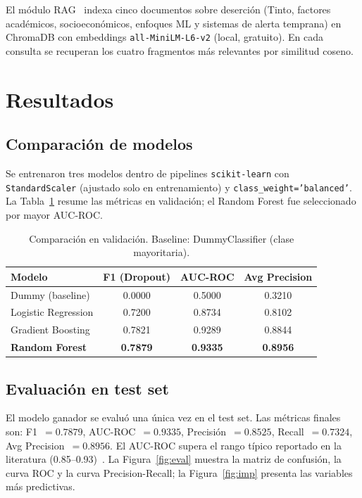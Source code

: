 \documentclass[11pt, a4paper]{article}
\begin{document}
El módulo RAG~\cite{chromadb2023} indexa cinco documentos sobre deserción
(Tinto, factores académicos, socioeconómicos, enfoques ML y sistemas de
alerta temprana) en ChromaDB con embeddings \texttt{all-MiniLM-L6-v2}
(local, gratuito). En cada consulta se recuperan los cuatro fragmentos
más relevantes por similitud coseno.

\section{Resultados}

\subsection{Comparación de modelos}

Se entrenaron tres modelos dentro de pipelines \texttt{scikit-learn} con
\texttt{StandardScaler} (ajustado solo en entrenamiento) y
\texttt{class\_weight='balanced'}. La Tabla~\ref{tab:modelos} resume las
métricas en validación; el Random Forest fue seleccionado por mayor AUC-ROC.

\begin{table}[H]
  \centering\small
  \caption{Comparación en validación. Baseline: DummyClassifier (clase mayoritaria).}
  \label{tab:modelos}
  \begin{tabular}{lccc}
    \toprule
    \textbf{Modelo} & \textbf{F1 (Dropout)} & \textbf{AUC-ROC} & \textbf{Avg Precision} \\
    \midrule
    Dummy (baseline)    & 0.0000 & 0.5000 & 0.3210 \\
    Logistic Regression & 0.7200 & 0.8734 & 0.8102 \\
    Gradient Boosting   & 0.7821 & 0.9289 & 0.8844 \\
    \textbf{Random Forest} & \textbf{0.7879} & \textbf{0.9335} & \textbf{0.8956} \\
    \bottomrule
  \end{tabular}
\end{table}

\subsection{Evaluación en test set}

El modelo ganador se evaluó una única vez en el test set. Las métricas
finales son: F1~$=0.7879$, AUC-ROC~$=0.9335$, Precisión~$=0.8525$,
Recall~$=0.7324$, Avg Precision~$=0.8956$. El AUC-ROC supera el rango
típico reportado en la literatura (0.85–0.93)~\cite{mduma2019}.
La Figura~\ref{fig:eval} muestra la matriz de confusión, la curva ROC
y la curva Precision-Recall; la Figura~\ref{fig:imp} presenta las
variables más predictivas.
\end{document}

